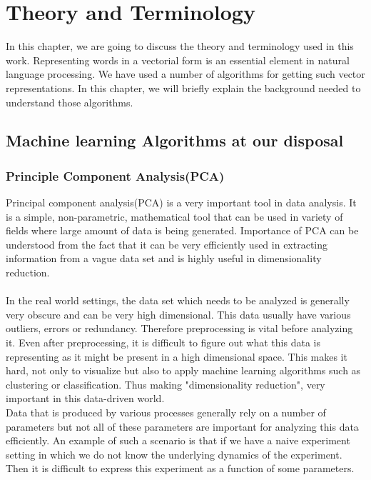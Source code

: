 \chapter{Theory and Terminology}
\label{cha:solutioni}
In this chapter, we are going to discuss the theory and terminology used in this work.
Representing words in a vectorial form is an essential element in natural language processing. We have used a number of algorithms for getting such vector representations. In this chapter, we will briefly explain the background needed to understand those algorithms.
\section{Machine learning Algorithms at our disposal}

\subsection{Principle Component Analysis(PCA)}
Principal component analysis(PCA) is a very important tool in data analysis. It is a simple, non-parametric, mathematical tool that can be used in variety of fields where large amount of data is being generated. Importance of PCA can be understood from the fact that it can be very efficiently used in extracting information from a vague data set and is highly useful in dimensionality reduction. \\\\
In the real world settings, the data set which needs to be analyzed is generally very obscure and can be very high dimensional. This data usually have various outliers, errors or redundancy. Therefore preprocessing is vital before analyzing it. Even after preprocessing, it is difficult to figure out what this data is representing as it might be present in a high dimensional space. This makes it hard, not only to visualize but also to apply machine learning algorithms such as clustering or classification. Thus making "dimensionality reduction", very important in this data-driven world.\\ 
Data that is produced by various processes generally rely on a number of parameters but not all of these parameters are important for analyzing this data efficiently. An example of such a scenario is that if we have a naive experiment setting in which we do not know the underlying dynamics of the experiment. Then it is difficult to express this experiment as a function of some parameters.\\\\
